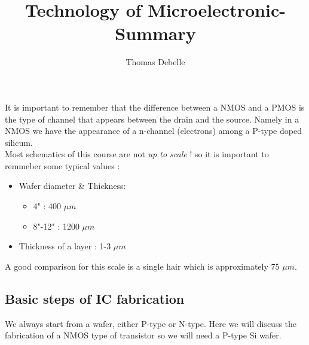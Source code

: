 \documentclass[
]{article}
\title{Technology of Microelectronic- Summary}
\author{Thomas Debelle}
\date{}
\begin{document}
\maketitle

It is important to remember that the difference between a NMOS and a
PMOS is the type of channel that appears between the drain and the
source. Namely in a NMOS we have the appearance of a n-channel
(electrons) among a P-type doped silicum.\\
Most schematics of this course are not \emph{up to scale} ! so it is
important to remmeber some typical values :

\begin{itemize}
\item
  Wafer diameter \& Thickness:

  \begin{itemize}
  \item
    4" : 400 \(\mu m\)
  \item
    8"-12" : 1200 \(\mu m\)
  \end{itemize}
\item
  Thickness of a layer : 1-3 \(\mu m\)
\end{itemize}

A good comparison for this scale is a single hair which is approximately
75 \(\mu m\).

\hypertarget{basic-steps-of-ic-fabrication}{%
\subsection{Basic steps of IC
fabrication}\label{basic-steps-of-ic-fabrication}}

We always start from a wafer, either P-type or N-type. Here we will
discuss the fabrication of a NMOS type of transistor so we will need a
P-type Si wafer.
\end{document}
